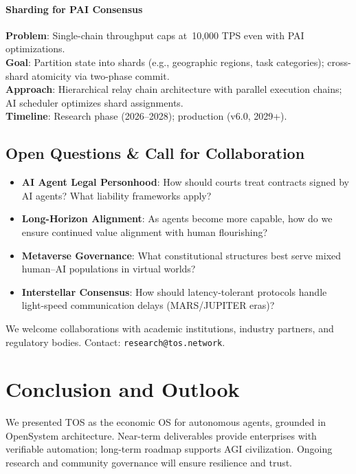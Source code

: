 \documentclass[11pt]{article}
\begin{document}
\paragraph{Sharding for PAI Consensus}
\textbf{Problem}: Single-chain throughput caps at~10,000 TPS even with PAI optimizations.\\
\textbf{Goal}: Partition state into shards (e.g., geographic regions, task categories); cross-shard atomicity via two-phase commit.\\
\textbf{Approach}: Hierarchical relay chain architecture with parallel execution chains; AI scheduler optimizes shard assignments.\\
\textbf{Timeline}: Research phase (2026--2028); production (v6.0, 2029+).

\subsection{Open Questions \& Call for Collaboration}

\begin{itemize}[noitemsep]
  \item \textbf{AI Agent Legal Personhood}: How should courts treat contracts signed by AI agents? What liability frameworks apply?
  \item \textbf{Long-Horizon Alignment}: As agents become more capable, how do we ensure continued value alignment with human flourishing?
  \item \textbf{Metaverse Governance}: What constitutional structures best serve mixed human--AI populations in virtual worlds?
  \item \textbf{Interstellar Consensus}: How should latency-tolerant protocols handle light-speed communication delays (MARS/JUPITER eras)?
\end{itemize}

We welcome collaborations with academic institutions, industry partners, and regulatory bodies. Contact: \texttt{research@tos.network}.

\section{Conclusion and Outlook}
We presented TOS as the economic OS for autonomous agents, grounded in OpenSystem architecture. Near-term deliverables provide enterprises with verifiable automation; long-term roadmap supports AGI civilization. Ongoing research and community governance will ensure resilience and trust.
\end{document}
